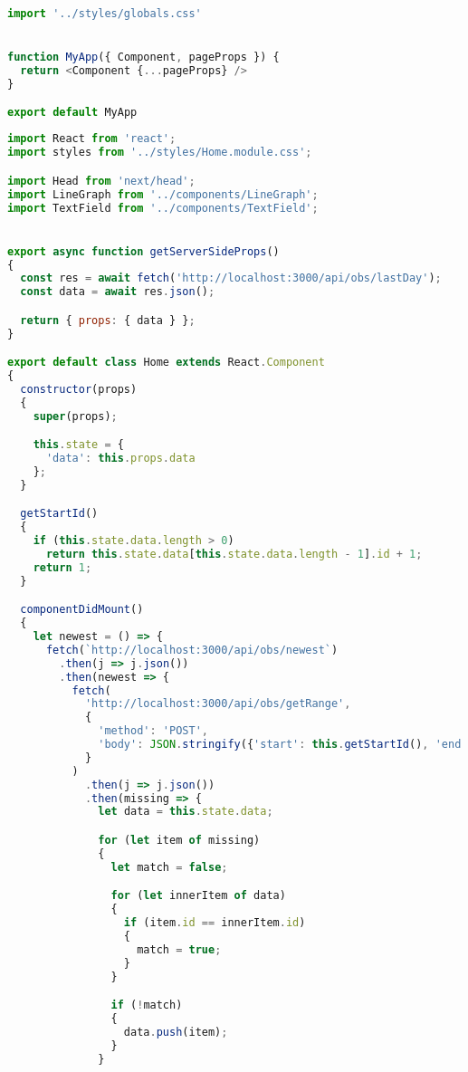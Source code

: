 \begin{lstlisting}[title={_app.js}, language=JavaScript]
import '../styles/globals.css'


function MyApp({ Component, pageProps }) {
  return <Component {...pageProps} />
}

export default MyApp
\end{lstlisting}

\bigskip

\begin{lstlisting}[title={index.js}, language=JavaScript]
import React from 'react';
import styles from '../styles/Home.module.css';

import Head from 'next/head';
import LineGraph from '../components/LineGraph';
import TextField from '../components/TextField';


export async function getServerSideProps()
{
  const res = await fetch('http://localhost:3000/api/obs/lastDay');
  const data = await res.json();

  return { props: { data } };
}

export default class Home extends React.Component
{
  constructor(props)
  {
    super(props);

    this.state = {
      'data': this.props.data
    };
  }

  getStartId()
  {
    if (this.state.data.length > 0)
      return this.state.data[this.state.data.length - 1].id + 1;
    return 1;
  }

  componentDidMount()
  {
    let newest = () => {
      fetch(`http://localhost:3000/api/obs/newest`)
        .then(j => j.json())
        .then(newest => {
          fetch(
            'http://localhost:3000/api/obs/getRange',
            {
              'method': 'POST',
              'body': JSON.stringify({'start': this.getStartId(), 'end': newest.id})
            }
          )
            .then(j => j.json())
            .then(missing => {
              let data = this.state.data;

              for (let item of missing)
              {
                let match = false;

                for (let innerItem of data)
                {
                  if (item.id == innerItem.id)
                  {
                    match = true;
                  }
                }

                if (!match)
                {
                  data.push(item);
                }
              }
              

\end{lstlisting}
